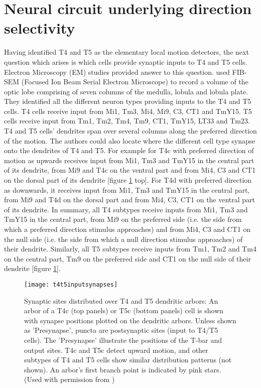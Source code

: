 \section{Neural circuit underlying direction selectivity}
Having identified T4 and T5 as the elementary local motion detectors, the next question which arises is which cells provide synaptic inputs to T4 and T5 cells. Electron Microscopy (EM) studies \parencite{Shinomiya2019, Takemura2017} provided answer to this question. \cite{Shinomiya2019} used FIB-SEM (Focused Ion Beam Serial Electron Microscope) to record a volume of the optic lobe comprising of seven columns of the medulla, lobula and lobula plate. They identified all the different neuron types providing inputs to the T4 and T5 cells. T4 cells receive input from Mi1, Tm3, Mi4, Mi9, C3, CT1 and TmY15. T5 cells receive input from Tm1, Tm2, Tm4, Tm9, CT1, TmY15, LT33 and Tm23. T4 and T5 cells' dendrites span over several columns along the preferred direction of the motion. The authors could also locate where the different cell type synapse onto the dendrites of T4 and T5. For example for T4c with preferred direction of motion as upwards receives input from Mi1, Tm3 and TmY15 in the central part of its dendrite, from Mi9 and T4c on the ventral part and from Mi4, C3 and CT1 on the dorsal part of its dendrite [figure \ref{fig:t4t5inputsynapses} top]. For T4d with preferred direction as downwards, it receives input from Mi1, Tm3 and TmY15 in the central part, from Mi9 and T4d on the dorsal part and from Mi4, C3, CT1 on the ventral part of its dendrite. In summary, all T4 subtypes receive inputs from Mi1, Tm3 and TmY15 in the central part, from Mi9 on the preferred side (i.e. the side from which a preferred direction stimulus approaches) and from Mi4, C3 and CT1 on the null side (i.e. the side from which a null direction stimulus approaches) of their dendrite. Similarly, all T5 subtypes receive inputs from Tm1, Tm2 and Tm4 on the central part, Tm9 on the preferred side and CT1 on the null side of their dendrite [figure \ref{fig:t4t5inputsynapses}]. %

\begin{figure}
\centering
\hspace*{-1.4cm} 
\texttt{[image: t4t5inputsynapses]}
\caption[Synaptic sites distributed over T4 and T5 dendritic arbors]{Synaptic sites distributed over T4 and T5 dendritic arbors: An arbor of a T4c (top panels) or T5c (bottom panels) cell is shown with synapse positions plotted on the dendritic arbors. Unless shown as 'Presynapse', puncta are postsynaptic sites (input to T4/T5 cells). The 'Presynapse' illustrate the positions of the T-bar and output sites. T4c and T5c detect upward motion, and other subtypes of T4 and T5 cells show similar distribution patterns (not shown). An arbor's first branch point is indicated by pink stars. (Used with permission from \cite{Shinomiya2019})}
\label{fig:t4t5inputsynapses}
\end{figure}

